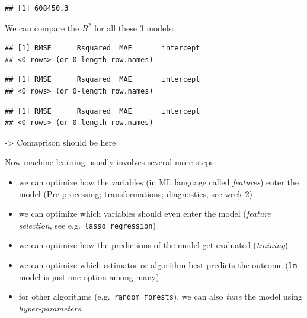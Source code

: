 \documentclass[
]{book}
\newenvironment{Shaded}{\begin{snugshade}}{\end{snugshade}}
\newcommand{\NormalTok}[1]{#1}
\newcommand{\SpecialCharTok}[1]{\textcolor[rgb]{0.81,0.36,0.00}{\textbf{#1}}}
\begin{document}
\begin{verbatim}
## [1] 608450.3
\end{verbatim}

We can compare the \(R^2\) for all these 3 models:

\begin{Shaded}
\end{Shaded}

\begin{verbatim}
## [1] RMSE      Rsquared  MAE       intercept
## <0 rows> (or 0-length row.names)
\end{verbatim}

\begin{Shaded}
\end{Shaded}

\begin{verbatim}
## [1] RMSE      Rsquared  MAE       intercept
## <0 rows> (or 0-length row.names)
\end{verbatim}

\begin{Shaded}
\end{Shaded}

\begin{verbatim}
## [1] RMSE      Rsquared  MAE       intercept
## <0 rows> (or 0-length row.names)
\end{verbatim}

-\textgreater{} Comaprison should be here

Now machine learning usually involves several more steps:

\begin{itemize}
\item
  we can optimize how the variables (in ML language called \emph{features}) enter the model (Pre-processing; transformations; diagnostics, see week \protect\hyperlink{eda-1}{2})
\item
  we can optimize which variables should even enter the model (\emph{feature selection}, see e.g.~\texttt{lasso\ regression})
\item
  we can optimize how the predictions of the model get evaluated (\emph{training})
\item
  we can optimize which estimator or algorithm best predicts the outcome (\texttt{lm} model is just one option among many)
\item
  for other algorithms (e.g.~\texttt{random\ forests}), we can also \emph{tune} the model using \emph{hyper-parameters}.
\end{itemize}
\end{document}

